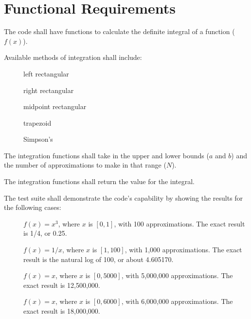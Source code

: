 \section{Functional Requirements}
\label{Functional_Requirements}

\begin{description}
  \item The code shall have functions to calculate the definite integral of a function ($f(x)$).
  \item Available methods of integration shall include:
  \begin{description}
    \item[] left rectangular
      \item[] right rectangular
        \item[] midpoint rectangular
    \item[] trapezoid
    \item[] Simpson's 
  \end{description}
  \item[\req{2}] The integration functions shall take in the upper and lower bounds ($a$ and $b$) and the number of 
approximations to make in that range ($N$). 
  \item[\req{3}] The integration functions shall return the value for the integral.
  \item The test suite shall demonstrate the code's capability by showing the results for the following cases:
  \begin{description}
    \item[]
    $f(x) = x^3$, where $x$ is $[0,1]$, with 100 approximations. The exact result is 1/4, or 0.25.
    \item[]
    $f(x) = 1/x$, where $x$ is $[1,100]$, with 1,000 approximations. The exact result is the natural log of 100, or about 4.605170.
    \item[]
    $f(x) = x$, where $x$ is $[0,5000]$, with 5,000,000 approximations. The exact result is 12,500,000.
    \item[]
    $f(x) = x$, where $x$ is $[0,6000]$, with 6,000,000 approximations. The exact result is 18,000,000.
  \end{description}
\end{description}
